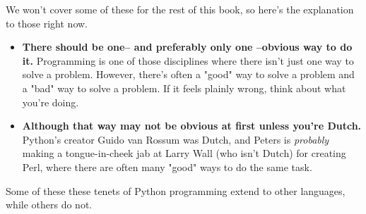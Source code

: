 We won't cover some of these for the rest of this book, so here's the explanation to those right now.\par
\begin{itemize}
    \item {\textbf{There should be one-- and preferably only one --obvious way to do it.} Programming is one of those disciplines where there isn't just one way to solve a problem. However, there's often a "good" way to solve a problem and a "bad" way to solve a problem. If it feels plainly wrong, think about what you're doing.}
    \item {\textbf{Although that way may not be obvious at first unless you're Dutch.} Python's creator Guido van Rossum was Dutch, and Peters is \textit{probably} making a tongue-in-cheek jab at Larry Wall (who isn't Dutch) for creating Perl, where there are often many "good" ways to do the same task.}
\end{itemize}
Some of these these tenets of Python programming extend to other languages, while others do not. 
